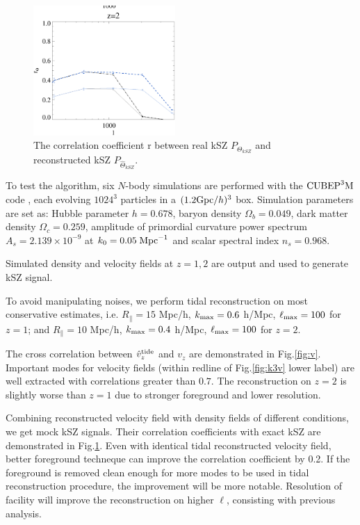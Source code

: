 \begin{figure}[tbp]
\begin{center}
\includegraphics[width=0.48\textwidth]{figure/cl_correlation_z1_z2.eps}
\end{center}
\vspace{-0.7cm}
\caption{The correlation coefficient r between real kSZ $P_{\Theta_{kSZ}}$ 
and reconstructed kSZ $P_{\hat \Theta_{kSZ}}$.
}
\label{fig:r}
\end{figure}
\label{ssec:tide}

To test the algorithm, six $N$-body simulations are performed with the
$\mathrm{CUBEP}^3\mathrm{M}$ code \cite{2013:code}, each evolving $1024^3$ particles in a $(1.2\mathrm{Gpc}/h)^3$ box. 
Simulation parameters are set as: Hubble parameter $h=0.678$, baryon
density $\Omega_{b}=0.049$, dark matter density $\Omega_{c}=0.259$,
amplitude of primordial curvature power spectrum $A_s=2.139\times10^{-9}$ at 
$k_0=0.05\;\mathrm{Mpc}^{-1}$ and scalar spectral index $n_s=0.968$.

Simulated density and velocity fields at $z=1,2$ are output 
and used to generate kSZ signal. 


To avoid manipulating noises, 
we perform tidal reconstruction on most conservative estimates, i.e. 
$R_\parallel=15$ Mpc/h, $k_\mathrm{max}=0.6$ h/Mpc, $\ell_\mathrm{max}=100$ for $z=1$; 
and $R_\parallel=10$ Mpc/h, $k_\mathrm{max}=0.4$ h/Mpc, $\ell_\mathrm{max}=100$ for $z=2$. 

The cross correlation between $\hat v_z^\mathrm{tide}$ and $v_z$ are demonstrated in Fig.\ref{fig:v}. 
Important modes for velocity fields (within redline of Fig.\ref{fig:k3v} lower label) are well extracted with correlations greater than $0.7$. 
The reconstruction on $z=2$ is slightly worse than $z=1$ 
due to stronger foreground and lower resolution. 

Combining reconstructed velocity field with density fields of different conditions, we get mock kSZ signals. 
Their correlation coefficients with exact kSZ are 
demonstrated in Fig.\ref{fig:r}. 
Even with identical tidal reconstructed velocity field, 
better foreground techneque can improve the correlation coefficient by 0.2. 
If the foreground is removed clean enough for more modes to be 
used in tidal reconstruction procedure, 
the improvement will be more notable.
Resolution of facility will improve the reconstruction on higher $\ell$, 
consisting with previous analysis.



